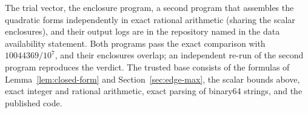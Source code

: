 \documentclass{siamart251216}
\begin{document}
The trial vector, the enclosure program, a second program that assembles the
quadratic forms independently in exact rational arithmetic (sharing the scalar
enclosures), and their output logs are in the repository named in the data
availability statement. Both programs pass the exact comparison with
$10044369/10^7$, and their enclosures overlap; an independent re-run of the
second program reproduces the verdict. The trusted base consists of the
formulas of Lemma~\ref{lem:closed-form} and Section~\ref{sec:edge-max}, the
scalar bounds above, exact integer and rational arithmetic, exact parsing of
binary64 strings, and the published code.



\end{document}

